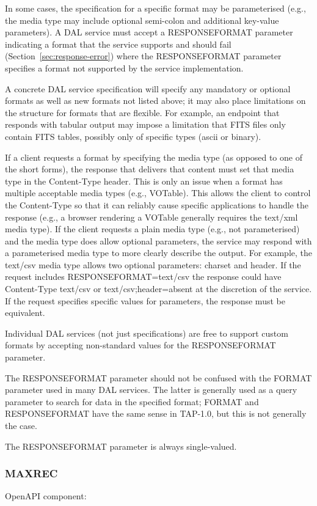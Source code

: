 \documentclass[11pt,letter]{ivoa}
\begin{document}
In some cases, the specification for a specific format may be parameterised
(e.g., the media type may include optional semi-colon and additional key-value
parameters). A DAL service must accept a RESPONSEFORMAT parameter indicating a
format that the service supports and should  fail (Section~\ref{sec:response-error})
where the RESPONSEFORMAT parameter specifies a format not supported by the service
implementation.

A concrete DAL service specification will specify any mandatory or optional
formats as well as new formats not listed above; it may also place limitations
on the structure for formats that are flexible.  For example, an endpoint that
responds with tabular output may impose a limitation that FITS files only
contain FITS tables, possibly only of specific types (ascii or binary).

If a client requests a format by specifying the media type (as opposed to one of
the short forms), the response that delivers that content must set that
media type
in the Content-Type header. This is only an issue when a format has multiple
acceptable media types (e.g., VOTable). This allows the client to control the
Content-Type so that it can reliably cause specific applications to handle the
response (e.g., a browser rendering a VOTable generally requires the text/xml
media type). If the client requests a plain media type (e.g., not parameterised) and
the media type does allow optional parameters, the service may respond with a
parameterised media type to more clearly describe the output. For example, the
text/csv media type allows two optional parameters: charset and header. If the
request includes RESPONSEFORMAT=text/csv the response could have Content-Type
text/csv or text/csv;header=absent at the discretion of the service. If the
request specifies specific values for parameters, the response must be
equivalent.

Individual DAL services (not just specifications) are free to support custom
formats by accepting non-standard values for the RESPONSEFORMAT parameter.

The RESPONSEFORMAT parameter should not be confused with the FORMAT parameter
used in many DAL services. The latter is generally used as a query parameter to
search for data in the specified format; FORMAT and RESPONSEFORMAT have the same
sense in TAP-1.0, but this is not generally the case.

The RESPONSEFORMAT parameter is always single-valued.

\subsubsection{MAXREC}
\label{sec:MAXREC}
OpenAPI component:\\ 
\end{document}
